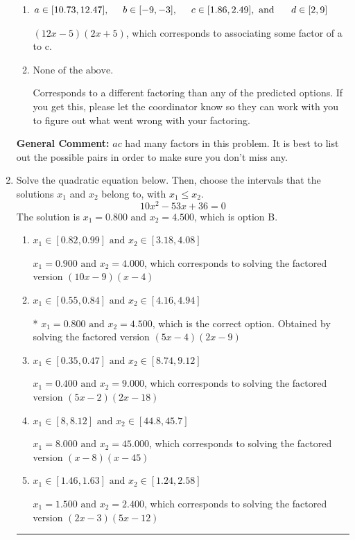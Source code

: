 \documentclass{extbook}[14pt]
\newcommand{\litem}[1]{\item #1

\rule{\textwidth}{0.4pt}}
\begin{document}
\begin{enumerate}
{\begin{enumerate}[label=\Alph*.]
 $(x -20)(x + 30)$, which corresponds to factoring $x^{2} +10 x -600$.
\item \( a \in [10.73, 12.47], \hspace*{5mm} b \in [-9, -3], \hspace*{5mm} c \in [1.86, 2.49], \text{ and } \hspace*{5mm} d \in [2, 9] \)

 $(12x -5)(2x + 5)$, which corresponds to associating some factor of a to c.
\item \( \text{None of the above.} \)

 Corresponds to a different factoring than any of the predicted options. If you get this, please let the coordinator know so they can work with you to figure out what went wrong with your factoring.
\end{enumerate}

\textbf{General Comment:} $ac$ had many factors in this problem. It is best to list out the possible pairs in order to make sure you don't miss any.
}
\litem{
Solve the quadratic equation below. Then, choose the intervals that the solutions $x_1$ and $x_2$ belong to, with $x_1 \leq x_2$.
\[ 10x^{2} -53 x + 36 = 0 \]The solution is \( x_1 = 0.800 \text{ and } x_2 = 4.500 \), which is option B.\begin{enumerate}[label=\Alph*.]
\item \( x_1 \in [0.82, 0.99] \text{ and } x_2 \in [3.18, 4.08] \)

$x_1 = 0.900 \text{ and } x_2 = 4.000$, which corresponds to solving the factored version $(10x -9)(x -4)$
\item \( x_1 \in [0.55, 0.84] \text{ and } x_2 \in [4.16, 4.94] \)

* $x_1 = 0.800 \text{ and } x_2 = 4.500$, which is the correct option. Obtained by solving the factored version $(5x -4)(2x -9)$
\item \( x_1 \in [0.35, 0.47] \text{ and } x_2 \in [8.74, 9.12] \)

$x_1 = 0.400 \text{ and } x_2 = 9.000$, which corresponds to solving the factored version $(5x -2)(2x -18)$
\item \( x_1 \in [8, 8.12] \text{ and } x_2 \in [44.8, 45.7] \)

$x_1 = 8.000 \text{ and } x_2 = 45.000$, which corresponds to solving the factored version $(x -8)(x -45)$
\item \( x_1 \in [1.46, 1.63] \text{ and } x_2 \in [1.24, 2.58] \)

$x_1 = 1.500 \text{ and } x_2 = 2.400$, which corresponds to solving the factored version $(2x -3)(5x -12)$
\end{enumerate}

}
\end{enumerate}
\end{document}
